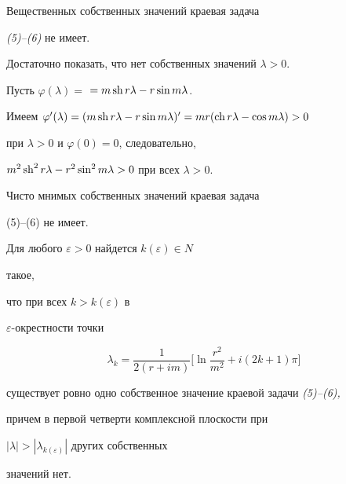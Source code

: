  


\begin{lem} Вещественных собственных значений краевая задача 


{\em (5)--(6)} не имеет. 


\end{lem} 


 


\begin{pf} Достаточно показать, что нет собственных значений $\lambda>0$. 


Пусть $\varphi(\lambda)=$ $=m\operatorname{sh} r\lambda-r\sin m\lambda$.




Имеем $\varphi'(\lambda)=(m\sh r\lambda-r\sin m\lambda)' 


=mr(\ch r\lambda-\cos m\lambda)>0$ 


при $\lambda>0$ и $\varphi(0)=0$, следовательно, 


$m^2\operatorname{sh}^2r\lambda-r^2\sin^2m\lambda>0$ при всех $\lambda>0$. 


\end{pf} 


 


\begin{cornonum} Чисто мнимых собственных значений краевая задача 


(5)--(6) не имеет. 


\end{cornonum}


 


\begin{lem} Для любого $\varepsilon>0$ найдется $k(\varepsilon)\in N$ 


такое, 


что при всех $k>k(\varepsilon)$ в \linebreak%


$\varepsilon$-окрестности точки 


\begin{equation} 


\lambda_k=\frac{1}{2(r+im)}\biggl[\ln\frac{r^2}{m^2}+i(2k+1)\pi\biggr] 


\end{equation} 


существует ровно одно собственное значение краевой задачи {\em (5)--(6),} 


причем в первой четверти комплексной плоскости при 


$|\lambda|>|\lambda_{k(\varepsilon)}|$ других собственных 


значений нет. 


\end{lem} 



